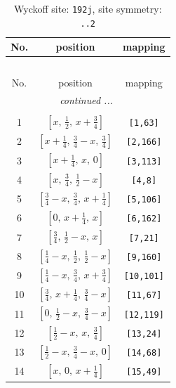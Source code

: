 \documentclass[fleqn,8pt]{jsarticle}
\begin{document}
\begin{longtable}{ccc}
\caption{Wyckoff site: {\tt 192j}, site symmetry: {\tt ..2}}
 \\
 \hline \hline
No. & position & mapping \\ \hline \endfirsthead

\multicolumn{2}{l}{\tablename\ \thetable{}} \\
 \hline \hline
No. & position & mapping \\ \hline \endhead

 \hline \hline
\multicolumn{2}{r}{\footnotesize\it continued ...} \\ \endfoot

 \hline \hline
\multicolumn{2}{r}{} \\ \endlastfoot

1 & $\left[ x,\, \frac{1}{2},\, x + \frac{3}{4} \right]$ & {\tt [1,63]} \\ \hline
2 & $\left[ x + \frac{1}{4},\, \frac{3}{4} - x,\, \frac{3}{4} \right]$ & {\tt [2,166]} \\ \hline
3 & $\left[ x + \frac{1}{4},\, x,\, 0 \right]$ & {\tt [3,113]} \\ \hline
4 & $\left[ x,\, \frac{3}{4},\, \frac{1}{2} - x \right]$ & {\tt [4,8]} \\ \hline
5 & $\left[ \frac{3}{4} - x,\, \frac{3}{4},\, x + \frac{1}{4} \right]$ & {\tt [5,106]} \\ \hline
6 & $\left[ 0,\, x + \frac{1}{4},\, x \right]$ & {\tt [6,162]} \\ \hline
7 & $\left[ \frac{3}{4},\, \frac{1}{2} - x,\, x \right]$ & {\tt [7,21]} \\ \hline
8 & $\left[ \frac{1}{4} - x,\, \frac{1}{2},\, \frac{1}{2} - x \right]$ & {\tt [9,160]} \\ \hline
9 & $\left[ \frac{1}{4} - x,\, \frac{3}{4},\, x + \frac{3}{4} \right]$ & {\tt [10,101]} \\ \hline
10 & $\left[ \frac{3}{4},\, x + \frac{1}{4},\, \frac{3}{4} - x \right]$ & {\tt [11,67]} \\ \hline
11 & $\left[ 0,\, \frac{1}{2} - x,\, \frac{3}{4} - x \right]$ & {\tt [12,119]} \\ \hline
12 & $\left[ \frac{1}{2} - x,\, x,\, \frac{3}{4} \right]$ & {\tt [13,24]} \\ \hline
13 & $\left[ \frac{1}{2} - x,\, \frac{3}{4} - x,\, 0 \right]$ & {\tt [14,68]} \\ \hline
14 & $\left[ x,\, 0,\, x + \frac{1}{4} \right]$ & {\tt [15,49]} \\ \hline

\end{longtable}
\end{document}
